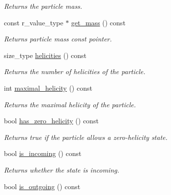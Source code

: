 \begin{DoxyCompactItemize}
\begin{DoxyCompactList}\small\item\em Returns the particle mass. \end{DoxyCompactList}\item 
\hypertarget{a00019_ae37b038b5d6c47e31aeebe829909efe9}{}const r\+\_\+value\+\_\+type $\ast$ \hyperlink{a00019_ae37b038b5d6c47e31aeebe829909efe9}{get\+\_\+mass} () const \label{a00019_ae37b038b5d6c47e31aeebe829909efe9}

\begin{DoxyCompactList}\small\item\em Returns particle mass const pointer. \end{DoxyCompactList}\item 
\hypertarget{a00019_a9b2f7518fa30de51dfd002906939e6f9}{}size\+\_\+type \hyperlink{a00019_a9b2f7518fa30de51dfd002906939e6f9}{helicities} () const \label{a00019_a9b2f7518fa30de51dfd002906939e6f9}

\begin{DoxyCompactList}\small\item\em Returns the number of helicities of the particle. \end{DoxyCompactList}\item 
\hypertarget{a00019_a668beb77a58aac3c8f88124adcbca3fb}{}int \hyperlink{a00019_a668beb77a58aac3c8f88124adcbca3fb}{maximal\+\_\+helicity} () const \label{a00019_a668beb77a58aac3c8f88124adcbca3fb}

\begin{DoxyCompactList}\small\item\em Returns the maximal helicity of the particle. \end{DoxyCompactList}\item 
\hypertarget{a00019_a91f560faec67848752e14f92957c1b65}{}bool \hyperlink{a00019_a91f560faec67848752e14f92957c1b65}{has\+\_\+zero\+\_\+helicity} () const \label{a00019_a91f560faec67848752e14f92957c1b65}

\begin{DoxyCompactList}\small\item\em Returns true if the particle allows a zero-\/helicity state. \end{DoxyCompactList}\item 
\hypertarget{a00019_a9183360f5bb25d8b53cc1da76a2ecff8}{}bool \hyperlink{a00019_a9183360f5bb25d8b53cc1da76a2ecff8}{is\+\_\+incoming} () const \label{a00019_a9183360f5bb25d8b53cc1da76a2ecff8}

\begin{DoxyCompactList}\small\item\em Returns whether the state is incoming. \end{DoxyCompactList}\item 
\hypertarget{a00019_aec434eb8de1fe70624f04bfbb8ce7dc7}{}bool \hyperlink{a00019_aec434eb8de1fe70624f04bfbb8ce7dc7}{is\+\_\+outgoing} () const \label{a00019_aec434eb8de1fe70624f04bfbb8ce7dc7}


\end{DoxyCompactItemize}
